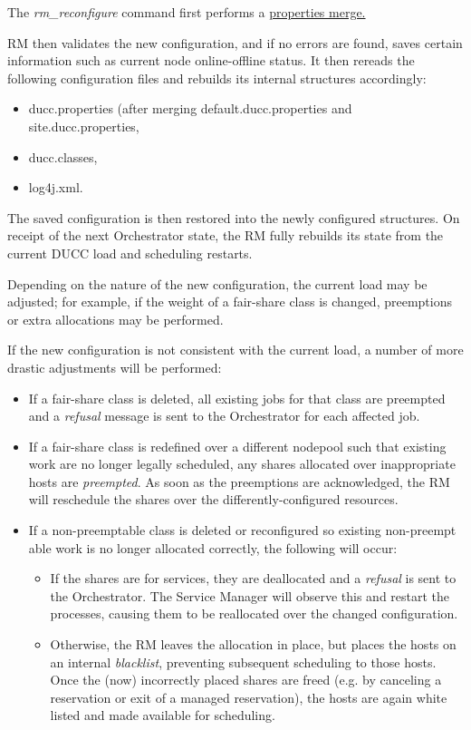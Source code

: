     The {\em rm\_reconfigure} command first performs a 
    \hyperref[sec:admin.properties-merge]{properties merge.}

    RM then validates the new
    configuration, and if no errors are found, saves certain information such as current node
    online-offline status.  It then rereads the following configuration files and rebuilds its
    internal structures accordingly:
    \begin{itemize}
      \item ducc.properties (after merging default.ducc.properties and site.ducc.properties,
      \item ducc.classes,
      \item log4j.xml.
    \end{itemize}
    The saved configuration is then restored into the newly configured structures.
    On receipt of the next Orchestrator state, the RM fully rebuilds its state from the current
    DUCC load and scheduling restarts.

    Depending on the nature of the new configuration, the current load may be adjusted; for
    example, if the weight of a fair-share class is changed, preemptions or extra allocations
    may be performed.

    If the new configuration is not consistent with the current load, a number of more drastic
    adjustments will be performed:
    \begin{itemize}
      \item If a fair-share class is deleted, all existing jobs for that class are preempted
        and a {\em refusal} message is sent to the Orchestrator for each affected job.
      \item If a fair-share class is redefined over a different nodepool such that existing
        work are no longer legally scheduled, any shares allocated over inappropriate
        hosts are {\em preempted}.  As soon as the preemptions are acknowledged, the RM
        will reschedule the shares over the differently-configured resources.
      \item If a non-preemptable class is deleted or reconfigured so existing non-preempt able
        work is no longer allocated correctly, the following will occur:
        \begin{itemize}
            \item If the shares are for services, they are deallocated and a {\em refusal} is
              sent to the Orchestrator.  The Service Manager will observe this and restart the
              processes, causing them to be reallocated over the changed configuration.
            \item Otherwise, the RM leaves the allocation in place, but places the hosts on an
              internal {\em blacklist}, preventing subsequent scheduling to those hosts. Once
              the (now) incorrectly placed shares are freed (e.g. by canceling a reservation or
              exit of a managed reservation), the hosts are again white listed and made available
              for scheduling.
        \end{itemize}
     \end{itemize}
        
